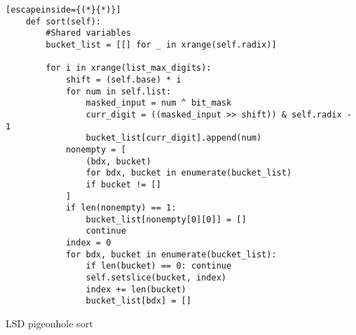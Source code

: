 \documentclass[12pt]{article}
\begin{document}
\begin{table}[H]
	\lstset{
		language=python,
    numbers=left,
    stepnumber=1,
    showstringspaces=false,
    tabsize=3,
    breaklines=true,
    breakatwhitespace=false,}
	\centering
	\begin{lstlisting}[escapeinside={(*}{*)}]
	def sort(self):
		#Shared variables
		bucket_list = [[] for _ in xrange(self.radix)]

		for i in xrange(list_max_digits):
			shift = (self.base) * i
			for num in self.list:
				masked_input = num ^ bit_mask
				curr_digit = ((masked_input >> shift)) & self.radix - 1
				bucket_list[curr_digit].append(num)
			nonempty = [
				(bdx, bucket)
				for bdx, bucket in enumerate(bucket_list)
				if bucket != []
			]
			if len(nonempty) == 1:
				bucket_list[nonempty[0][0]] = []
				continue
			index = 0
			for bdx, bucket in enumerate(bucket_list):
				if len(bucket) == 0: continue
				self.setslice(bucket, index)
				index += len(bucket)
				bucket_list[bdx] = []
\end{lstlisting}
\caption*{LSD pigeonhole sort}
\end{table}
\pagebreak
\end{document}
